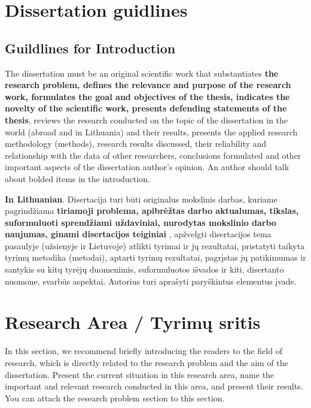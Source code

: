 \section{Dissertation guidlines}
\label{sec:dissertation_guildines}

\subsection{Guildlines for Introduction}
The dissertation must be an original scientific work that substantiates \textbf{the research problem, defines the relevance and purpose of the research work, formulates the goal and objectives of the thesis, indicates the novelty of the scientific work, presents defending statements of the thesis}, reviews the research conducted on the topic of the dissertation in the world (abroad and in Lithuania) and their results, presents the applied research methodology (methods), research results discussed, their reliability and relationship with the data of other researchers, conclusions formulated and other important aspects of the dissertation author's opinion. 
An author should talk about bolded items in the introduction.

\textbf{In Lithuanian}. Disertacija turi būti originalus mokslinis darbas, kuriame pagrindžiama \textbf{tiriamoji problema, apibrėžtas darbo aktualumas, tikslas, suformuluoti sprendžiami uždaviniai, nurodytas mokslinio darbo naujumas, ginami disertacijos teiginiai} , apžvelgti disertacijos tema pasaulyje (užsienyje ir Lietuvoje) atlikti tyrimai ir jų rezultatai, pristatyti taikyta tyrimų metodika (metodai), aptarti tyrimų rezultatai, pagrįstas jų patikimumas ir santykis su kitų tyrėjų duomenimis, suformuluotos išvados ir kiti, disertanto nuomone, svarbūs aspektai.
Autorius turi aprašyti paryškintus elementus įvade.


\section*{Research Area / Tyrimų sritis}

In this section, we recommend briefly introducing the readers to the field of research, which is directly related to the research problem and the aim of the dissertation. Present the current situation in this research area, name the important and relevant research conducted in this area, and present their results. You can attach the research problem section to this section.

